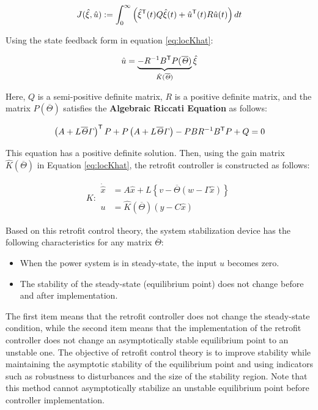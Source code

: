 \documentclass[graybox, envcountchap]{svmult}
\begin{document}
\[
  J(\hat{\xi},\hat{u}) :=\int_0^{\infty} \left(
  \hat{\xi}^{\sf T}(t) Q \hat{\xi}(t)
  +
  \hat{u}^{\sf T}(t) R \hat{u}(t)
  \right) dt
\]

Using the state feedback form in equation \ref{eq:locKhat}:

\begin{equation}\label{eq:locKhat}
  \hat{u}=\underbrace{-R^{-1}B^{\sf T}P(\overline{\mathit{\Theta}}) }_{\hat{K}(\overline{\mathit{\Theta}}) }
  \hat{\xi}
\end{equation}


Here, $Q$ is a semi-positive definite matrix, $R$ is a positive definite matrix,
and the matrix $P(\overline{\mathit{\Theta}})$ satisfies the \textbf{Algebraic
Riccati Equation}  as follows:

\[
  \left( A+L \overline{\mathit{\Theta}} 
  \mathit{\Gamma} \right)^{\sf T} P +
  P \left( A+L \overline{\mathit{\Theta}} 
  \mathit{\Gamma} \right)
  -PB R^{-1} B^{\sf T} P +Q = 0
\]

This equation has a positive definite solution. Then, using the gain matrix
$\hat{K}(\overline{\mathit{\Theta}})$ in Equation \ref{eq:locKhat}, the retrofit
controller is constructed as follows:

\begin{equation}\label{eq:retroK}
K: \begin{aligned}
  \dot{\hat{x}} &=  A \hat{x} + L \left\{
  v - \overline{\mathit{\Theta}} (w- \mathit{\Gamma} \hat{x}) 
  \right\}\\
  u &= \hat{K}(\overline{\mathit{\Theta}}) (y - C\hat{x})
  \end{aligned} 
\end{equation}

Based on this retrofit control theory, the system stabilization device has the
following characteristics for any matrix $\overline{\mathit{\Theta}}$:

\begin{itemize}
  \item When the power system is in steady-state, the input $u$ becomes zero.
  \item The stability of the steady-state (equilibrium point) does not change before and after implementation.
\end{itemize}

The first item means that the retrofit controller does not change the
steady-state condition, while the second item means that the implementation of
the retrofit controller does not change an asymptotically stable equilibrium
point to an unstable one. The objective of retrofit control theory is to improve
stability while maintaining the asymptotic stability of the equilibrium point
and using indicators such as robustness to disturbances and the size of the
stability region. Note that this method cannot asymptotically stabilize an
unstable equilibrium point before controller implementation.
\end{document}
